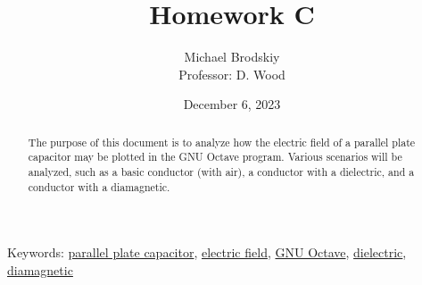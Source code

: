 


\title{Homework C}
\date{December 6, 2023}
\author{Michael Brodskiy\\ \small Professor: D. Wood}



\maketitle

\newpage

\begin{abstract}

  The purpose of this document is to analyze how the electric field of a parallel plate capacitor may be plotted in the GNU Octave program. Various scenarios will be analyzed, such as a basic conductor (with air), a conductor with a dielectric, and a conductor with a diamagnetic.

\end{abstract}

\begin{flushleft}
  Keywords: \underline{parallel plate capacitor}, \underline{electric field}, \underline{GNU Octave}, \underline{dielectric}, \underline{diamagnetic}
\end{flushleft}



